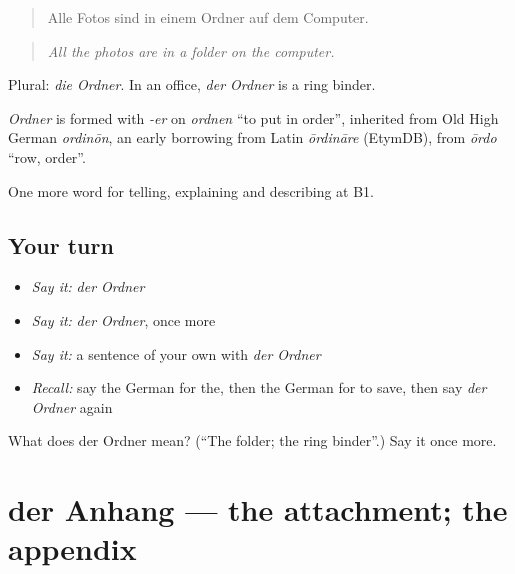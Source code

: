 \begin{quote}
Alle Fotos sind in einem Ordner auf dem Computer.
\end{quote}

\begin{quote}
\emph{All the photos are in a folder on the computer.}
\end{quote}

Plural: \emph{die Ordner}. In an office, \emph{der Ordner} is a ring binder.

\begin{cousinweb}
\emph{Ordner} is formed with \emph{-er} on \emph{ordnen} \textquotedblleft{}to put in order\textquotedblright{}, inherited from Old High German \emph{ordinōn}, an early borrowing from Latin \emph{ōrdināre} (EtymDB), from \emph{ōrdo} \textquotedblleft{}row, order\textquotedblright{}.
\end{cousinweb}

\begin{grammarlens}[title={What you've built}]
One more word for telling, explaining and describing at B1.
\end{grammarlens}

\subsection*{Your turn}
\begin{itemize}
\raggedright
  \item \emph{Say it:} \emph{der Ordner}
  \item \emph{Say it:} \emph{der Ordner}, once more
  \item \emph{Say it:} a sentence of your own with \emph{der Ordner}
  \item \emph{Recall:} say the German for the, then the German for to save, then say \emph{der Ordner} again
\end{itemize}

\begin{tcolorbox}[breakable,colback=teal!4,colframe=teal!35!black,title={Before you move on}]
What does der Ordner mean? (\textquotedblleft{}The folder; the ring binder\textquotedblright{}.) Say it once more.
\end{tcolorbox}
\section[der Anhang]{der Anhang — the attachment; the appendix}

\label{lesson:GE-C393-anhang}



